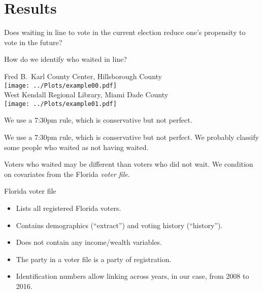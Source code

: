 \documentclass{beamer}
\begin{document}
                \section{Results}
	
		\begin{frame}
		Does waiting in line to vote in the current election reduce one's propensity to vote in the future?
		\end{frame}

		\begin{frame}
                  How do we identify who waited in line?
		\end{frame}
 
		\begin{frame}				
			\centering 
			Fred B.\ Karl County Center, Hillsborough County\\
			\texttt{[image: ../Plots/example00.pdf]} \\
			West Kendall Regional Library, Miami Dade County\\
			\texttt{[image: ../Plots/example01.pdf]} \\ 
		\end{frame}

		\begin{frame}
                  We use a 7:30pm rule, which is conservative but not
                  perfect.
		\end{frame}

		\begin{frame}
                  We use a 7:30pm rule, which is conservative but not
                  perfect.   We probably classify some people
                  who waited as not having waited.
		\end{frame}


		\begin{frame}
                  Voters who waited may be different than voters who
                  did not wait.  We condition on covariates from the
                  Florida \emph{voter file}.
		\end{frame}



		\begin{frame}
                  Florida voter file
                  \begin{itemize}
                    \item <2-> Lists all registered Florida voters.
                    \item <3-> Contains demographics (``extract'') and
                      voting history (``history'').
                    \item <4-> Does not contain any income/wealth
                      variables.
                    \item <5-> The party in a voter file is a party of
                      registration.
                    \item <6-> Identification numbers allow linking
                      across years, in our case, from 2008 to 2016.
                    \end{itemize}
                  \end{frame}
\end{document}
